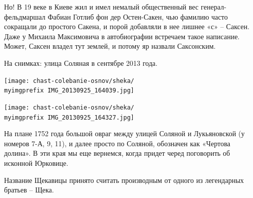 
Но! В 19 веке в Киеве жил и имел немалый общественный вес генерал-фельдмаршал Фабиан Готлиб фон дер Остен-Сакен, чью фамилию часто сокращали до простого Сакена, и порой добавляли в нее лишнее «с» – Саксен. Даже у Михаила Максимовича в автобиографии встречаем такое написание. Может, Саксен владел тут землей, и потому яр назвали Саксонским.

На снимках: улица Соляная в сентябре 2013 года.

\begin{center}
\texttt{[image: chast-colebanie-osnov/sheka/\\myimgprefix IMG\_20130925\_164039.jpg]}
\end{center}

\begin{center}
\texttt{[image: chast-colebanie-osnov/sheka/\\myimgprefix IMG\_20130925\_164327.jpg]}
\end{center}
 
\newpage

На плане 1752 года большой овраг между улицей Соляной и Лукьяновской (у номеров 7-А, 9, 11), и далее просто по Соляной, обозначен как «Чертова долина». В эти края мы еще вернемся, когда придет черед поговорить об исконной Юрковице.




Название Щекавицы принято считать производным от одного из легендарных братьев – Щека.

